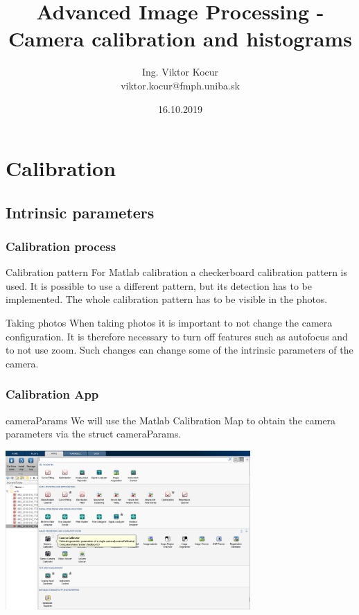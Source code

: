 \documentclass{beamer}
\title[4. cvičenie]{Advanced Image Processing - Camera calibration and histograms}
\author[Kocur]{Ing. Viktor Kocur \\{\small viktor.kocur@fmph.uniba.sk}}
\institute{DAI FMFI UK}
\date{16.10.2019}
\begin{document}

\begin{frame}
  \titlepage
\end{frame}

\section{Calibration}
\subsection{Intrinsic parameters}
\begin{frame}
\frametitle{Calibration process}
\begin{block}{Calibration pattern}
For Matlab calibration a checkerboard calibration pattern is used. It is possible to use a different pattern, but its detection has to be implemented. The whole calibration pattern has to be visible in the photos.
\end{block}

\begin{alertblock}{Taking photos}
When taking photos it is important to not change the camera configuration. It is therefore necessary to turn off features such as autofocus and to not use zoom. Such changes can change some of the intrinsic parameters of the camera.
\end{alertblock}
\end{frame}

\begin{frame}
\frametitle{Calibration App}
\begin{block}{cameraParams}
We will use the Matlab Calibration Map to obtain the camera parameters via the struct cameraParams.
\end{block}

\begin{center}
\includegraphics[width=0.7\textwidth]{calib_app.png}
\end{center}
\end{frame}
\end{document}
